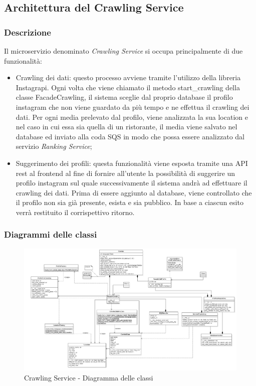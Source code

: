 \subsection{Architettura del Crawling Service}

\subsubsection{Descrizione}
Il microservizio denominato \textit{Crawling Service} si occupa principalmente di due funzionalità:
\begin{itemize}
    \item Crawling dei dati: questo processo avviene tramite l'utilizzo della libreria Instagrapi. Ogni volta che viene chiamato il metodo start\_crawling della classe FacadeCrawling, il sistema sceglie dal proprio database il profilo instagram che non viene guardato da più tempo e ne effettua il crawling dei dati. Per ogni media prelevato dal profilo, viene analizzata la sua location e nel caso in cui essa sia quella di un ristorante, il media viene salvato nel database ed inviato alla coda SQS in modo che possa essere analizzato dal servizio \textit{Ranking Service};
    \item Suggerimento dei profili: questa funzionalità viene esposta tramite una API rest al frontend al fine di fornire all'utente la possibilità di suggerire un profilo instagram sul quale successivamente il sistema andrà ad effettuare il crawling dei dati. Prima di essere aggiunto al database, viene controllato che il profilo non sia già presente, esista e sia pubblico. In base a ciascun esito verrà restituito il corrispettivo ritorno.
\end{itemize}

\subsubsection{Diagrammi delle classi}
\begin{figure}[h]
    \centering
    \includegraphics[scale=0.35]{Contenuto/Immagini/classi-CS.PNG}
    \caption{Crawling Service - Diagramma delle classi}
\end{figure}
